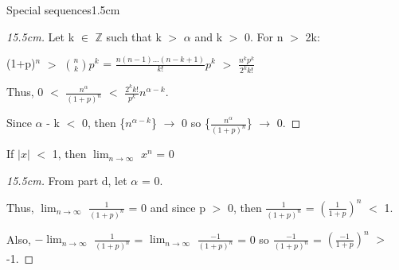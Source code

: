 \begin{ltheorem}{Special sequences}{1.5cm}
			\begin{proof}[15.5cm]
				Let k $\in$ $\mathbb{Z}$ such that k $>$ $\alpha$ and k $>$ 0.
				For n $>$ 2k:

				\hspace{1cm}
				(1+p)$^n$ $>$ $\binom{n}{k} p^k$
				= $\frac{n(n-1)...(n-k+1)}{k!} p^k$
				$>$ $\frac{n^k p^k}{2^k k!}$

				Thus, 0 $<$ $\frac{n^{\alpha}}{(1+p)^n}$
				$<$ $\frac{2^k k!}{p^k} n^{\alpha - k}$.
				
				Since $\alpha$ - k $<$ 0, then \{$n^{\alpha - k}$\} $\rightarrow$ 0
				so \{$\frac{n^{\alpha}}{(1+p)^n}$\} $\rightarrow$ 0.				
			\end{proof}

		\item If $|x|$ $<$ 1, then $\lim_{n \rightarrow \infty}$ $x^n$ = 0

			\begin{proof}[15.5cm]
				From part d, let $\alpha$ = 0.

				Thus, $\lim_{n \rightarrow \infty}$ $\frac{1}{(1+p)^n}$ = 0
				and since p $>$ 0, then $\frac{1}{(1+p)^n}$ = $(\frac{1}{1+p})^n$ $<$ 1.

				Also, $-\lim_{n \rightarrow \infty}$ $\frac{1}{(1+p)^n}$
				= $\lim_{n \rightarrow \infty}$ $\frac{-1}{(1+p)^n}$ = 0
				so $\frac{-1}{(1+p)^n}$ = $(\frac{-1}{1+p})^n$ $>$ -1.				
			\end{proof}
	\end{ltheorem}




	